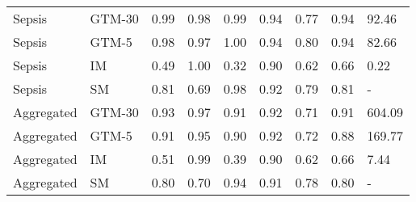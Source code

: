 \begin{tabular}{llrrrrrrl}
Sepsis & GTM-30 & 0.99 & 0.98 & 0.99 & 0.94 & 0.77 & 0.94 & 92.46 \\
Sepsis & GTM-5 & 0.98 & 0.97 & 1.00 & 0.94 & 0.80 & 0.94 & 82.66 \\
Sepsis & IM & 0.49 & 1.00 & 0.32 & 0.90 & 0.62 & 0.66 & 0.22 \\
Sepsis & SM & 0.81 & 0.69 & 0.98 & 0.92 & 0.79 & 0.81 & - \\
Aggregated & GTM-30 & 0.93 & 0.97 & 0.91 & 0.92 & 0.71 & 0.91 & 604.09 \\
Aggregated & GTM-5 & 0.91 & 0.95 & 0.90 & 0.92 & 0.72 & 0.88 & 169.77 \\
Aggregated & IM & 0.51 & 0.99 & 0.39 & 0.90 & 0.62 & 0.66 & 7.44 \\
Aggregated & SM & 0.80 & 0.70 & 0.94 & 0.91 & 0.78 & 0.80 & - \\
\bottomrule
\end{tabular}
